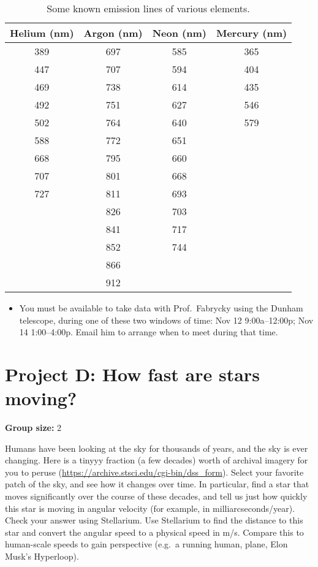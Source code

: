 \begin{table}
	\centering
	\begin{tabular}{c|c|c|c}
		\toprule
		\textbf{Helium (nm)} & \textbf{Argon (nm)} & \textbf{Neon (nm)} & \textbf{Mercury (nm)} \\ \midrule
		389 & 697 & 585 & 365 \\
		447 & 707 & 594 & 404 \\
		469 & 738 & 614 & 435 \\
		492 & 751 & 627 & 546 \\
		502 & 764 & 640 & 579 \\
		588 & 772 & 651 & \\
		668 & 795 & 660 & \\
		707 & 801 & 668 & \\
		727 & 811 & 693 & \\
		& 826 & 703 & \\
		& 841 & 717 & \\
		& 852 & 744 & \\
		& 866 & & \\
		& 912 & & \\ \bottomrule
	\end{tabular}
	\caption{Some known emission lines of various elements.}\label{sp:tab:emissions}
\end{table}

\begin{itemize}
	\item You must be available to take data with Prof.\ Fabrycky using the Dunham telescope, during one of these two windows of time: Nov 12 9:00a--12:00p; Nov 14 1:00--4:00p. Email him to arrange when to meet during that time.
\end{itemize}

\section{Project D: How fast are stars moving?}

\textbf{Group size:} 2

Humans have been looking at the sky for thousands of years, and the sky is ever changing. Here is a tinyyy fraction (a few decades) worth of archival imagery for you to peruse (\url{https://archive.stsci.edu/cgi-bin/dss_form}). Select your favorite patch of the sky, and see how it changes over time. In particular, find a star that moves significantly over the course of these decades, and tell us just how quickly this star is moving in angular velocity (for example, in milliarcseconds/year). Check your answer using Stellarium. Use Stellarium to find the distance to this star and convert the angular speed to a physical speed in m/s. Compare this to human-scale speeds to gain perspective (e.g.\ a running human, plane, Elon Musk's Hyperloop).

